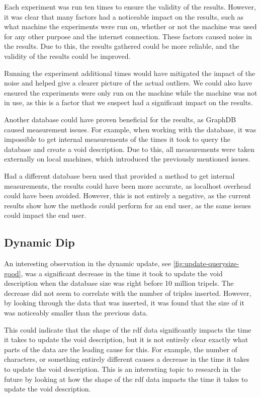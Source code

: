 Each experiment was run ten times to ensure the validity of the results. However, it was clear that many factors had a noticeable impact on the results, such as what machine the experiments were run on, whether or not the machine was used for any other purpose and the internet connection. These factors caused noise in the results. Due to this, the results gathered could be more reliable, and the validity of the results could be improved.

Running the experiment additional times would have mitigated the impact of the noise and helped give a clearer picture of the actual outliers. We could also have ensured the experiments were only run on the machine while the machine was not in use, as this is a factor that we suspect had a significant impact on the results.

Another database could have proven beneficial for the results, as GraphDB caused measurement issues. For example, when working with the database, it was impossible to get internal measurements of the times it took to query the database and create a \gls{void} description. Due to this, all measurements were taken externally on local machines, which introduced the previously mentioned issues.

Had a different database been used that provided a method to get internal measurements, the results could have been more accurate, as localhost overhead could have been avoided. However, this is not entirely a negative, as the current results show how the methods could perform for an end user, as the same issues could impact the end user.

\subsection{Dynamic Dip}\label{subsec:dynamic-dip}
An interesting observation in the dynamic update, see \autoref{fig:update-querysize-good}, was a significant decrease in the time it took to update the \gls{void} description when the database size was right before 10 million tripels. The decrease did not seem to correlate with the number of triples inserted. However, by looking through the data that was inserted, it was found that the size of it was noticeably smaller than the previous data.

This could indicate that the shape of the \gls{rdf} data significantly impacts the time it takes to update the \gls{void} description, but it is not entirely clear exactly what parts of the data are the leading cause for this. For example, the number of characters, or something entirely different causes a decrease in the time it takes to update the \gls{void} description. This is an interesting topic to research in the future by looking at how the shape of the \gls{rdf} data impacts the time it takes to update the \gls{void} description.


